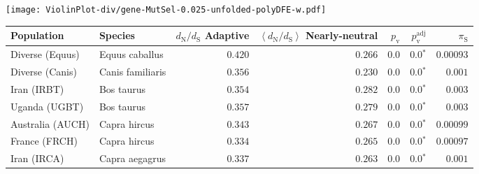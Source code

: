 \begin{center}
\begin{adjustbox}{width = 1\textwidth}
\begin{tabular}{|l|l|r|r|r|r|r|r|r|}
\bottomrule
\end{tabular}
\end{adjustbox}
\newpage
\texttt{[image: ViolinPlot-div/gene-MutSel-0.025-unfolded-polyDFE-w.pdf]} 
\begin{adjustbox}{width = 1\textwidth}
\begin{tabular}{|l|l|r|r|r|r|r|}
\toprule
                     Population &              Species & \specialcell{$d_{\mathrm{N}} / d_{\mathrm{S}}$ \\ Adaptive} & \specialcell{$\left< d_{\mathrm{N}} / d_{\mathrm{S}} \right>$ \\ Nearly-neutral} & $p_{\mathrm{v}}$ & $p_{\mathrm{v}}^{\mathrm{adj}}$ & $\pi_{\textrm{S}}$ \\
\midrule
                Diverse (Equus) &       Equus caballus &                                           $ 0.420$ &                                           $ 0.266$ &            $0.0$ &                  $\bm{0.0{^*}}$ &          $0.00093$ \\
                Diverse (Canis) &     Canis familiaris &                                           $ 0.356$ &                                           $ 0.230$ &            $0.0$ &                  $\bm{0.0{^*}}$ &           $ 0.001$ \\
                    Iran (IRBT) &           Bos taurus &                                           $ 0.354$ &                                           $ 0.282$ &            $0.0$ &                  $\bm{0.0{^*}}$ &           $ 0.003$ \\
                  Uganda (UGBT) &           Bos taurus &                                           $ 0.357$ &                                           $ 0.279$ &            $0.0$ &                  $\bm{0.0{^*}}$ &           $ 0.003$ \\
               Australia (AUCH) &         Capra hircus &                                           $ 0.343$ &                                           $ 0.267$ &            $0.0$ &                  $\bm{0.0{^*}}$ &          $0.00099$ \\
                  France (FRCH) &         Capra hircus &                                           $ 0.334$ &                                           $ 0.265$ &            $0.0$ &                  $\bm{0.0{^*}}$ &          $0.00097$ \\
                    Iran (IRCA) &       Capra aegagrus &                                           $ 0.337$ &                                           $ 0.263$ &            $0.0$ &                  $\bm{0.0{^*}}$ &           $ 0.001$ \\

\end{tabular}
\end{adjustbox}
\end{center}
